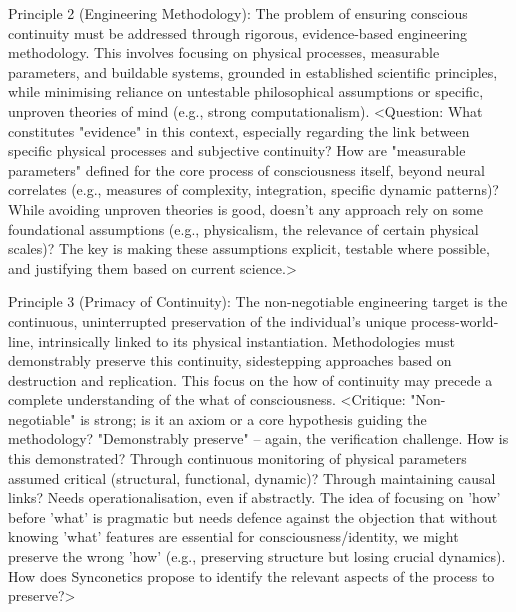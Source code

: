 \documentclass[10pt]{article}
\begin{document}
\begin{sloppypar}
  Principle 2 (Engineering Methodology): The problem of ensuring conscious continuity must be addressed through rigorous, evidence-based engineering methodology. This involves focusing on physical processes, measurable parameters, and buildable systems, grounded in established scientific principles, while minimising reliance on untestable philosophical assumptions or specific, unproven theories of mind (e.g., strong computationalism). <Question: What constitutes "evidence" in this context, especially regarding the link between specific physical processes and subjective continuity? How are "measurable parameters" defined for the core process of consciousness itself, beyond neural correlates (e.g., measures of complexity, integration, specific dynamic patterns)? While avoiding unproven theories is good, doesn't any approach rely on some foundational assumptions (e.g., physicalism, the relevance of certain physical scales)? The key is making these assumptions explicit, testable where possible, and justifying them based on current science.>

  Principle 3 (Primacy of Continuity): The non-negotiable engineering target is the continuous, uninterrupted preservation of the individual's unique process-world-line, intrinsically linked to its physical instantiation. Methodologies must demonstrably preserve this continuity, sidestepping approaches based on destruction and replication. This focus on the how of continuity may precede a complete understanding of the what of consciousness. <Critique: "Non-negotiable" is strong; is it an axiom or a core hypothesis guiding the methodology? "Demonstrably preserve" – again, the verification challenge. How is this demonstrated? Through continuous monitoring of physical parameters assumed critical (structural, functional, dynamic)? Through maintaining causal links? Needs operationalisation, even if abstractly. The idea of focusing on 'how' before 'what' is pragmatic but needs defence against the objection that without knowing 'what' features are essential for consciousness/identity, we might preserve the wrong 'how' (e.g., preserving structure but losing crucial dynamics). How does Synconetics propose to identify the relevant aspects of the process to preserve?>


\end{sloppypar}
\end{document}
